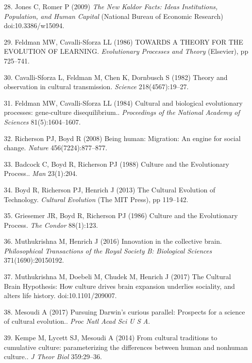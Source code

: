 \documentclass{pnastwo}
\begin{document}
\begin{article}
\label{csl:28}28. Jones C, Romer P (2009) \textit{{The New Kaldor Facts: Ideas Institutions, Population, and Human Capital}} (National Bureau of Economic Research) doi:10.3386/w15094.

\label{csl:29}29. Feldman MW, Cavalli-Sforza LL (1986) {{TOWARDS} A {THEORY} {FOR} {THE} {EVOLUTION} {OF} {LEARNING}}. \textit{Evolutionary Processes and Theory} (Elsevier), pp 725–741.

\label{csl:30}30. Cavalli-Sforza L, Feldman M, Chen K, Dornbusch S (1982) {Theory and observation in cultural transmission}. \textit{Science} 218(4567):19–27.

\label{csl:31}31. Feldman MW, Cavalli-Sforza LL (1984) {Cultural and biological evolutionary processes: gene-culture disequilibrium.}. \textit{Proceedings of the National Academy of Sciences} 81(5):1604–1607.

\label{csl:32}32. Richerson PJ, Boyd R (2008) {Being human: Migration: An engine for social change}. \textit{Nature} 456(7224):877–877.

\label{csl:33}33. Badcock C, Boyd R, Richerson PJ (1988) {Culture and the Evolutionary Process.}. \textit{Man} 23(1):204.

\label{csl:34}34. Boyd R, Richerson PJ, Henrich J (2013) {The Cultural Evolution of Technology}. \textit{Cultural Evolution} (The {MIT} Press), pp 119–142.

\label{csl:35}35. Griesemer JR, Boyd R, Richerson PJ (1986) {Culture and the Evolutionary Process}. \textit{The Condor} 88(1):123.

\label{csl:36}36. Muthukrishna M, Henrich J (2016) {Innovation in the collective brain}. \textit{Philosophical Transactions of the Royal Society B: Biological Sciences} 371(1690):20150192.

\label{csl:37}37. Muthukrishna M, Doebeli M, Chudek M, Henrich J (2017) {The Cultural Brain Hypothesis: How culture drives brain expansion underlies sociality, and alters life history}. doi:10.1101/209007.

\label{csl:38}38. Mesoudi A (2017) {Pursuing Darwin's curious parallel: Prospects for a science of cultural evolution.}. \textit{Proc Natl Acad Sci U S A}.

\label{csl:39}39. Kempe M, Lycett SJ, Mesoudi A (2014) {From cultural traditions to cumulative culture: parameterizing the differences between human and nonhuman culture.}. \textit{J Theor Biol} 359:29–36.


\end{article}
\end{document}
